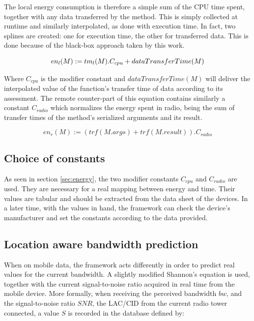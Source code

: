 \documentclass[10pt, conference, letterpaper]{IEEEtran}
\begin{document}
  The local energy consumption is therefore a simple sum of the CPU time spent, together with any data transferred by the method. This is simply collected at runtime and similarly interpolated, as done with execution time. In fact, two splines are created: one for execution time, the other for transferred data. This is done because of the black-box approach taken by this work. 

  \begin{equation} \label{eq:energylocal}
    en_{l}(M) := \\ tm_{l}(M) . C_{cpu} + dataTransferTime(M)
  \end{equation}

  Where $C_{cpu}$ is the modifier constant and $dataTransferTime(M)$ will deliver the interpolated value of the function's transfer time of data according to its assessment. The remote counter-part of this equation contains similarly a constant $C_{radio}$ which normalizes the energy spent in radio, being the sum of transfer times of the method's serialized arguments and its result.

  \begin{equation} \label{eq:energyremote}
    en_{r}(M) := (trf(M.args) + trf(M.result)) . C_{radio}
  \end{equation}

  \subsection{Choice of constants}
  As seen in section \ref{sec:energy}, the two modifier constants $C_{cpu}$ and $C_{radio}$ are used. They are necessary for a real mapping between energy and time. Their values are tabular and should be extracted from the data sheet of the devices. In a later time, with the values in hand, the framework can check the device's manufacturer and set the constants according to the data provided.

  \subsection{Location aware bandwidth prediction}
  When on mobile data, the framework acts differently in order to predict real values for the current bandwidth. A slightly modified Shannon's equation is used, together with the current signal-to-noise ratio acquired in real time from the mobile device. More formally, when receiving the perceived bandwidth $bw$, and the signal-to-noise ratio $SNR$, the LAC/CID from the current radio tower connected, a value $S$ is recorded in the database defined by:
\end{document}
